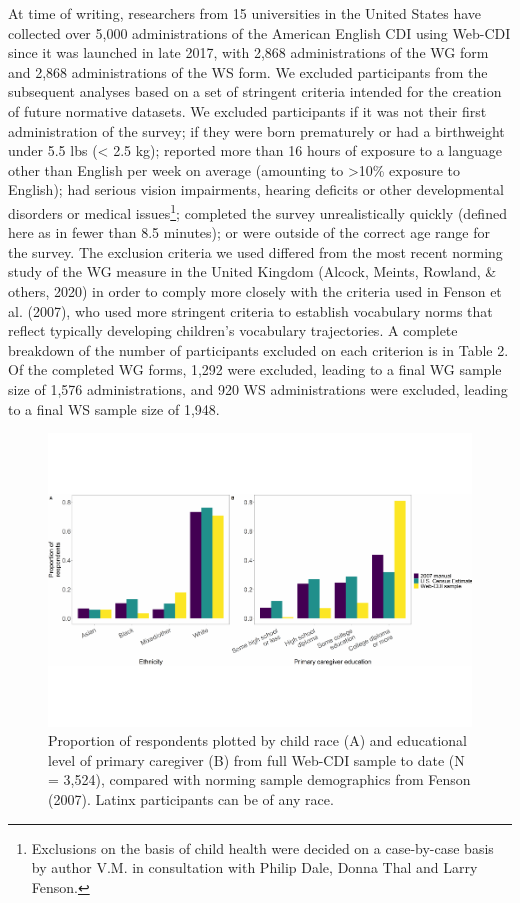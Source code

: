 \documentclass[
  english,
  man]{apa7}
\begin{document}
At time of writing, researchers from 15 universities in the United States have collected over 5,000 administrations of the American English CDI using Web-CDI since it was launched in late 2017, with 2,868 administrations of the WG form and 2,868 administrations of the WS form. We excluded participants from the subsequent analyses based on a set of stringent criteria intended for the creation of future normative datasets. We excluded participants if it was not their first administration of the survey; if they were born prematurely or had a birthweight under 5.5 lbs (\textless{} 2.5 kg); reported more than 16 hours of exposure to a language other than English per week on average (amounting to \textgreater10\% exposure to English); had serious vision impairments, hearing deficits or other developmental disorders or medical issues\footnote{Exclusions on the basis of child health were decided on a case-by-case basis by author V.M. in consultation with Philip Dale, Donna Thal and Larry Fenson.}; completed the survey unrealistically quickly (defined here as in fewer than 8.5 minutes); or were outside of the correct age range for the survey. The exclusion criteria we used differed from the most recent norming study of the WG measure in the United Kingdom (Alcock, Meints, Rowland, \& others, 2020) in order to comply more closely with the criteria used in Fenson et al. (2007), who used more stringent criteria to establish vocabulary norms that reflect typically developing children's vocabulary trajectories. A complete breakdown of the number of participants excluded on each criterion is in Table 2. Of the completed WG forms, 1,292 were excluded, leading to a final WG sample size of 1,576 administrations, and 920 WS administrations were excluded, leading to a final WS sample size of 1,948.

\begin{figure}
\centering
\includegraphics{webcdi_paper_files/figure-latex/demobarfig-1.pdf}
\caption{\label{fig:demobarfig}Proportion of respondents plotted by child race (A) and educational level of primary caregiver (B) from full Web-CDI sample to date (N = 3,524), compared with norming sample demographics from Fenson (2007). Latinx participants can be of any race.}
\end{figure}
\end{document}
